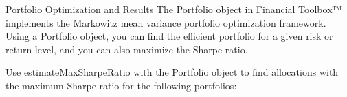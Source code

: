
Portfolio Optimization and Results
The Portfolio object in Financial Toolbox™ implements the Markowitz mean variance portfolio optimization framework. Using a Portfolio object, you can find the efficient portfolio for a given risk or return level, and you can also maximize the Sharpe ratio.

Use estimateMaxSharpeRatio with the Portfolio object to find allocations with the maximum Sharpe ratio for the following portfolios:



%
%
%
%
%
%

